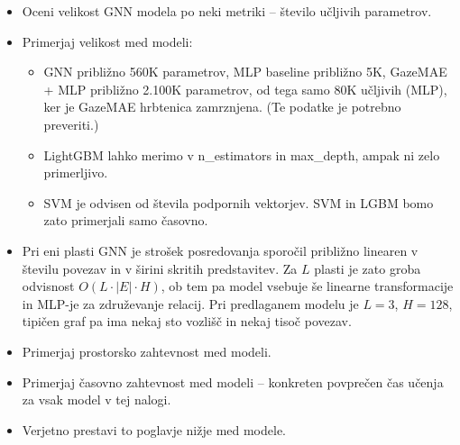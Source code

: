 \begin{itemize}
    \item Oceni velikost GNN modela po neki metriki -- število učljivih parametrov.
    \item Primerjaj velikost med modeli:
    \begin{itemize}
        \item GNN približno 560K parametrov, MLP baseline približno 5K, GazeMAE + MLP približno 2.100K parametrov, od tega samo 80K učljivih (MLP), ker je GazeMAE hrbtenica zamrznjena. (Te podatke je potrebno preveriti.)
        \item LightGBM lahko merimo v n\_estimators in max\_depth, ampak ni zelo primerljivo.
        \item SVM je odvisen od števila podpornih vektorjev. SVM in LGBM bomo zato primerjali samo časovno.
    \end{itemize}
    \item Pri eni plasti GNN je strošek posredovanja sporočil približno linearen v številu povezav in v širini skritih predstavitev. Za $L$ plasti je zato groba odvisnost $O(L \cdot |E| \cdot H)$, ob tem pa model vsebuje še linearne transformacije in MLP-je za združevanje relacij. Pri predlaganem modelu je $L=3$, $H=128$, tipičen graf pa ima nekaj sto vozlišč in nekaj tisoč povezav.
    \item Primerjaj prostorsko zahtevnost med modeli.
    \item Primerjaj časovno zahtevnost med modeli -- konkreten povprečen čas učenja za vsak model v tej nalogi.
    \item Verjetno prestavi to poglavje nižje med modele.
\end{itemize}

